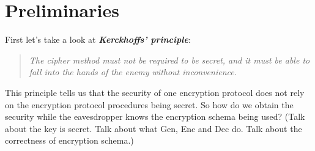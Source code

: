 \section{Preliminaries}
\par First let's take a look at \textbf{\textit{Kerckhoffs’ principle}}:
\begin{quote}
  \textit{The cipher method must not be required to be secret, and it must be able to fall into the hands of the enemy without inconvenience.}
\end{quote}
This principle tells us that the security of one encryption protocol does not rely on the encryption protocol procedures being secret. So how do we obtain the security while the eavesdropper knows the encryption schema being used? (Talk about the key is secret. Talk about what Gen, Enc and Dec do. Talk about the correctness of encryption schema.)

